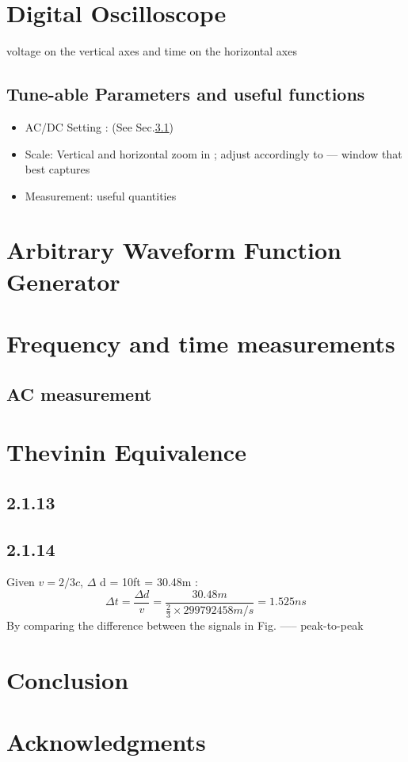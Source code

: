 \documentclass[10pt,letterpaper,oneside] {article}
\begin{document}
\section{Digital Oscilloscope}
voltage on the vertical axes and time on the horizontal axes
\subsection{Tune-able Parameters and useful functions}
\begin{itemize}
\item AC/DC Setting : (See Sec.\ref{sec:acdc})
\item Scale: Vertical and horizontal zoom in ; adjust accordingly to --- window that best captures
\item Measurement: useful quantities 
\end{itemize}
\section{Arbitrary Waveform Function Generator}
\section{Frequency and time measurements}
\subsection{AC measurement}\label{sec:acdc}
\section{Thevinin Equivalence}
\subsection{2.1.13}
\subsection{2.1.14}
Given $v = 2/3c$, $\Delta$ d  = 10ft = 30.48m :
\begin{equation}
\Delta t = \frac{\Delta d}{v} = \frac{30.48m}{\frac{2}{3}\times 299792458 m/s} = 1.525 ns
\end{equation}
By comparing the difference between the signals in Fig. ----- peak-to-peak
 \section{Conclusion}
\section{Acknowledgments}


\end{document}
